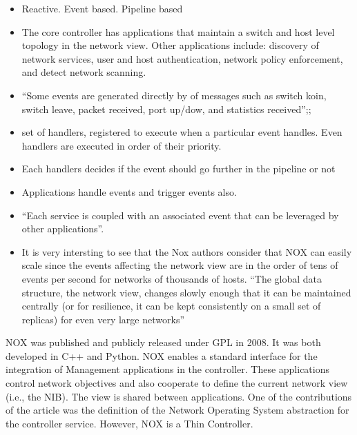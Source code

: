 \begin{itemize}
\begin{itemize}
\item Reactive. Event based.   Pipeline based 
\item The core controller has applications that maintain a switch and host level topology in the network view. Other applications include: discovery of network services, user and host authentication, network policy enforcement, and detect network scanning. 
\item ``Some events are generated directly by \gls{of} messages such as switch koin, switch leave, packet received, port up/dow, and statistics received'';;
\item set of handlers, registered to execute when a particular event handles. Even handlers are executed in order of their priority.
\item Each handlers decides if the event should go further in the pipeline or not
\item Applications handle events and trigger events also. 
\item ``Each service is coupled with an associated event that can be leveraged by other applications''. 


\item It is very intersting to see that the Nox authors consider that NOX can easily scale since the events affecting the network view are in the order of tens of events per second for networks of thousands of hosts. ``The global data structure, the network view, changes slowly enough that it can be maintained centrally (or for resilience, it can be kept consistently on a small set of replicas) for even very large networks'' 
\end{itemize}


NOX \cite{Gude:2008jd}  was published and publicly released under
GPL in 2008. It was both developed in C++ and Python. NOX enables a standard interface for the integration of  Management applications 
in the controller. These applications control
network objectives and also cooperate to define the current
network view (i.e., the NIB). The view is shared between applications. One of the
contributions of the article was the definition of the Network
Operating System abstraction for the controller service. However, NOX
is a Thin Controller. 


\end{itemize}
